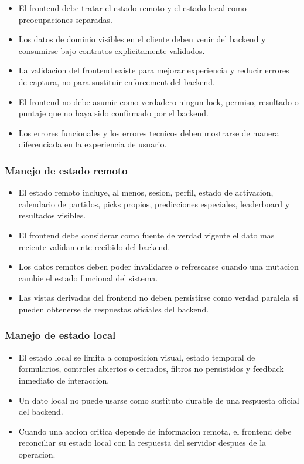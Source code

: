 \begin{itemize}
  \item El frontend debe tratar el estado remoto y el estado local como preocupaciones separadas.
  \item Los datos de dominio visibles en el cliente deben venir del backend y consumirse bajo contratos explicitamente validados.
  \item La validacion del frontend existe para mejorar experiencia y reducir errores de captura, no para sustituir enforcement del backend.
  \item El frontend no debe asumir como verdadero ningun lock, permiso, resultado o puntaje que no haya sido confirmado por el backend.
  \item Los errores funcionales y los errores tecnicos deben mostrarse de manera diferenciada en la experiencia de usuario.
\end{itemize}

\subsubsection{Manejo de estado remoto}

\begin{itemize}
  \item El estado remoto incluye, al menos, sesion, perfil, estado de activacion, calendario de partidos, picks propios, predicciones especiales, leaderboard y resultados visibles.
  \item El frontend debe considerar como fuente de verdad vigente el dato mas reciente validamente recibido del backend.
  \item Los datos remotos deben poder invalidarse o refrescarse cuando una mutacion cambie el estado funcional del sistema.
  \item Las vistas derivadas del frontend no deben persistirse como verdad paralela si pueden obtenerse de respuestas oficiales del backend.
\end{itemize}

\subsubsection{Manejo de estado local}

\begin{itemize}
  \item El estado local se limita a composicion visual, estado temporal de formularios, controles abiertos o cerrados, filtros no persistidos y feedback inmediato de interaccion.
  \item Un dato local no puede usarse como sustituto durable de una respuesta oficial del backend.
  \item Cuando una accion critica depende de informacion remota, el frontend debe reconciliar su estado local con la respuesta del servidor despues de la operacion.
\end{itemize}

